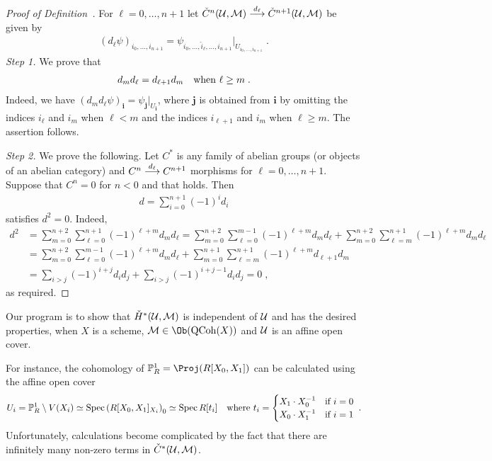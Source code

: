 \documentclass[a4paper,parskip=half,numbers=enddot, DIV=12]{scrreprt}
\begin{document}
\begin{proof}[Proof of Definition~]
	For $\ell=0,\ldots,n+1$ let $\check{C}^n(\Uu,\Mm)\morphism[d_\ell]\check{C}^{n+1}(\Uu,\Mm)$ be given by
	\begin{align*}
		(d_\ell\psi)_{i_0,\ldots,i_{n+1}}=\psi_{i_0,\ldots,\hat{i}_\ell,\ldots,i_{n+1}}|_{U_{i_0,\ldots,i_{n+1}}}\;.
	\end{align*}
	\emph{Step 1.} We prove that
	\begin{align}\lbl{eq:simplicialStuff}
		d_md_\ell=d_{\ell+1}d_m\quad\text{when }\ell\geq m\;.
	\end{align}
	Indeed, we have $(d_md_\ell\psi)_{\mathbf{i}}=\psi_{\mathbf{j}}|_{U_{\mathbf{i}}}$, where $\mathbf{j}$ is obtained from $\mathbf{i}$ by omitting the indices $i_\ell$ and $i_m$ when $\ell<m$ and the indices $i_{\ell+1}$ and $i_m$ when $\ell\geq m$. The assertion follows.
	
	\emph{Step 2.} We prove the following. Let $C^*$ is any family of abelian groups (or objects of an abelian category) and $C^n\morphism[d_\ell]C^{n+1}$ morphisms for $\ell=0,\ldots,n+1$. Suppose that $C^n=0$ for $n<0$ and that  holds. Then 
	\begin{align*}
		d=\sum_{i=0}^{n+1}(-1)^id_i
	\end{align*}
	satisfies $d^2=0$. Indeed,
	\begin{align*}
		d^2&=\sum_{m=0}^{n+2}\sum_{\ell=0}^{n+1}(-1)^{\ell+m}d_md_\ell=\sum_{m=0}^{n+2}\sum_{\ell=0}^{m-1}(-1)^{\ell+m}d_md_\ell+\sum_{m=0}^{n+2}\sum_{\ell=m}^{n+1}(-1)^{\ell+m}d_md_\ell\\
		&=\sum_{m=0}^{n+2}\sum_{\ell=0}^{m-1}(-1)^{\ell+m}d_md_\ell+\sum_{m=0}^{n+1}\sum_{\ell=m}^{n+1}(-1)^{\ell+m}d_{\ell+1}d_m\\
		&=\sum_{i>j}(-1)^{i+j}d_id_j+\sum_{i>j}(-1)^{i+j-1}d_id_j=0\;,
	\end{align*}
	as required.
\end{proof}
\begin{rem*}
	Our program is to show that $\check{H}^*(\mathcal{U},\mathcal{M})$ is independent of $\mathcal{U}$ and has the desired properties, when $X$ is a scheme, $\Mm\in\Ob(\cat{QCoh}(X))$ and $\mathcal{U}$ is an affine open cover.
\end{rem*}
\begin{rem*}
	For instance, the cohomology of $\IP_R^1=\Proj(R[X_0,X_1])$ can be calculated using the affine open cover 
	\begin{align*}
		U_i=\mathbb{P}_R^1\setminus V(X_i)\simeq \operatorname{Spec} \left(R[X_0,X_1]_{X_i}\right)_0\simeq \operatorname{Spec} R[t_i]\quad\text{where }t_i=
		\begin{cases}
			X_1\cdot X_0^{-1} & \text{if }i=0\\
			X_0\cdot X_1^{-1} & \text{if }i=1
		\end{cases}\;.
	\end{align*}
	Unfortunately, calculations become complicated by the fact that there are infinitely many non-zero terms in $\check{C}^*(\mathcal{U},\mathcal{M})$.
\end{rem*}
\end{document}
